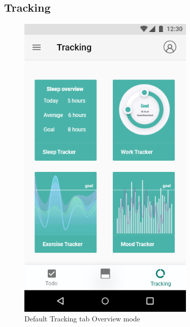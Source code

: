 \documentclass[a4paper,11pt]{article} %
\begin{document}
\subsection{Tracking}
\begin{figure}[h!]
  \centering
  \includegraphics[width=0.75\textwidth]{img/ui-wireframe/Tracking.png}
  \caption{Default Tracking tab Overview mode}
\end{figure}
\end{document}

